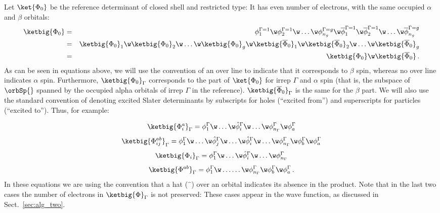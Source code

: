 \documentclass[a4paper,11pt]{article}
\newcommand{\irp}{\ensuremath{\Gamma}}
\begin{document}
Let $\ket{\Phi_0}$ be the reference determinant of closed shell and restricted type:
It has even number of electrons, with the same occupied $\alpha$ and $\beta$ orbitals:
\begin{eqnarray}
  \ketbig{\Phi_0}
  &=& \phi_1^{\irp=1} \w \phi_2^{\irp=1} \w
      \dots \w \phi_{n_g}^{\irp=g} \w
      \overline{\phi}_1^{\irp=1} \w \overline{\phi}_2^{\irp=1} \w
      \dots \w \overline{\phi}_{n_g}^{\irp=g}\\
  &=& \ketbig{\Phi_0}_1 \w \ketbig{\Phi_0}_2 \w
      \dots \w \ketbig{\Phi_0}_g \w
      \ketbig{\overline{\Phi}_0}_1 \w \ketbig{\overline{\Phi}_0}_2 \w
      \dots \w \ketbig{\overline{\Phi}_0}_g\\
  &=& \ketbig{\Phi_0} \w \ketbig{\overline{\Phi}_0}\,.
\end{eqnarray}
As can be seen in equations above, we will use the convention of an over line to indicate that it corresponds to $\beta$ spin, whereas no over line indicates $\alpha$ spin.
Furthermore, $\ketbig{\Phi_0}_\irp$ corresponds to the part of $\ket{\Phi_0}$ for irrep $\irp$ and $\alpha$ spin (that is, the subspace of $\orbSp{}$ spanned by the occupied alpha orbitals of irrep $\irp$ in the reference).
$\ketbig{\overline{\Phi}_0}_\irp$ is the same for the $\beta$ part.
We will also use the standard convention of denoting excited Slater determinants by subscripts for holes (``excited from'') and superscripts for particles (``excited to'').
Thus, for example:

\begin{equation}
  \ketbig{\Phi_i^a}_\irp = \phi_1^\irp \w \dots \w \hat{\phi}_i^\irp \w
  \dots \w \phi_{n_\irp}^\irp \w \phi_a^\irp
\end{equation}
\begin{equation}
  \ketbig{\Phi_{ij}^{ab}}_\irp = \phi_1^\irp \w \dots
  \w \hat{\phi}_j^\irp \w \dots \w \hat{\phi}_i^\irp \w
  \dots \w \phi_{n_\irp}^\irp \w \phi_b^\irp \w \phi_a^\irp
\end{equation}
\begin{equation}
  \ketbig{\Phi_i}_\irp = \phi_1^\irp \w \dots \w \hat{\phi}_i^\irp \w
  \dots \w \phi_{n_\irp}^\irp
\end{equation}
\begin{equation}
  \ketbig{\Phi^{ab}}_\irp = \phi_1^\irp \w \dots
  \dots \w \phi_{n_\irp}^\irp \w \phi_b^\irp \w \phi_a^\irp\,.
\end{equation}
In these equations we are using the convention that a hat ($\hat{\phantom{a}}$) over an orbital indicates its absence in the product.
Note that in the last two cases the number of electrons in $\ketbig{\Phi}_\irp$ is not preserved:
These cases appear in the wave function, as discussed in Sect.~\ref{sec:alg_two}.
\end{document}
